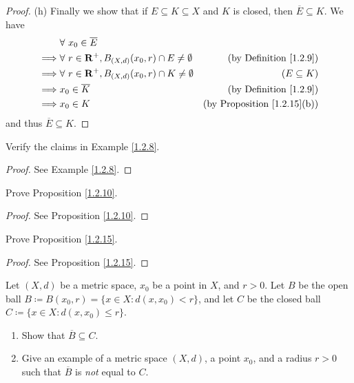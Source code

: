 \begin{proof}{(h)}
    Finally we show that if \(E \subseteq K \subseteq X\) and \(K\) is closed, then \(\overline{E} \subseteq K\).
    We have
    \begin{align*}
                 & \forall\ x_0 \in \overline{E}                                                                                   \\
        \implies & \forall\ r \in \mathbf{R}^+, B_{(X, d)}(x_0, r) \cap E \neq \emptyset & \text{(by Definition \ref{1.2.9})}      \\
        \implies & \forall\ r \in \mathbf{R}^+, B_{(X, d)}(x_0, r) \cap K \neq \emptyset & (E \subseteq K)                         \\
        \implies & x_0 \in \overline{K}                                                  & \text{(by Definition \ref{1.2.9})}      \\
        \implies & x_0 \in K                                                             & \text{(by Proposition \ref{1.2.15}(b))}
    \end{align*}
    and thus \(\overline{E} \subseteq K\).
\end{proof}

\exercisesection

\begin{exercise}\label{ex 1.2.1}
    Verify the claims in Example \ref{1.2.8}.
\end{exercise}

\begin{proof}
    See Example \ref{1.2.8}.
\end{proof}

\begin{exercise}\label{ex 1.2.2}
    Prove Proposition \ref{1.2.10}.
\end{exercise}

\begin{proof}
    See Proposition \ref{1.2.10}.
\end{proof}

\begin{exercise}\label{ex 1.2.3}
    Prove Proposition \ref{1.2.15}.
\end{exercise}

\begin{proof}
    See Proposition \ref{1.2.15}.
\end{proof}

\begin{exercise}\label{ex 1.2.4}
    Let \((X, d)\) be a metric space, \(x_0\) be a point in \(X\), and \(r > 0\).
    Let \(B\) be the open ball \(B \coloneqq B(x_0, r) = \{x \in X : d(x, x_0) < r\}\), and let \(C\) be the closed ball \(C \coloneqq \{x \in X : d(x, x_0) \leq r\}\).
    \begin{enumerate}
        \item Show that \(\overline{B} \subseteq C\).
        \item Give an example of a metric space \((X, d)\), a point \(x_0\), and a radius \(r > 0\) such that \(\overline{B}\) is \emph{not} equal to \(C\).
    \end{enumerate}
\end{exercise}

